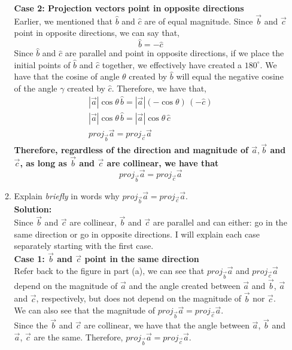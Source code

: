 \documentclass[12pt]{book}
\begin{document}
\begin{enumerate}
\begin{enumerate}
\textbf{Case 2: Projection vectors point in opposite directions}\\
Earlier, we mentioned that $\hat{b}$ and $\hat{c}$ are of equal magnitude. Since $\vec{b}$ and $\vec{c}$ point in opposite directions, we can say that,
$$\hat{b} = -\hat{c}$$
Since $\hat{b}$ and $\hat{c}$ are parallel and point in opposite directions, if we place the initial points of $\hat{b}$ and $\hat{c}$ together, we effectively have created a $180^{\circ}$. We have that the cosine of angle $\theta$ created by $\hat{b}$ will equal the negative cosine of the angle $\gamma$ created by $\hat{c}$. Therefore, we have that,
\begin{align}
    |\vec{a}| \cos\theta \, \hat{b} = |\vec{a}| (-\cos\theta) \, (-\hat{c}) \\
    |\vec{a}| \cos\theta \, \hat{b} = |\vec{a}| \cos\theta \, \hat{c}\\
    proj_{\vec{b}}\vec{a} = proj_{\vec{c}}\vec{a}
\end{align}
\textbf{Therefore, regardless of the direction and magnitude of $\vec{a}, \vec{b}$ and $\vec{c}$, as long as $\vec{b}$ and $\vec{c}$ are collinear, we have that
$$proj_{\vec{b}}\vec{a} = proj_{\vec{c}}\vec{a}$$}



\item Explain \emph{briefly} in words why $proj_{\vec{b}}\vec{a} = proj_{\vec{c}}\vec{a}$.\\

\textbf{Solution:}\\
Since $\vec{b}$ and $\vec{c}$ are collinear, $\vec{b}$ and $\vec{c}$ are parallel and can either: go in the same direction or go in opposite directions. I will explain each case separately starting with the first case.\\

\textbf{Case 1: $\vec{b}$ and $\vec{c}$ point in the same direction}\\
Refer back to the figure in part (a), we can see that $proj_{\vec{b}}\vec{a}$ and $proj_{\vec{c}}\vec{a}$ depend on the magnitude of $\vec{a}$ and the angle created between $\vec{a}$ and $\vec{b}$, $\vec{a}$ and $\vec{c}$, respectively, but does not depend on the magnitude of $\vec{b}$ nor $\vec{c}$. We can also see that
the magnitude of $proj_{\vec{b}}\vec{a} = proj_{\vec{c}}\vec{a}$.\\

Since the $\vec{b}$ and $\vec{c}$ are collinear, we have that the angle between $\vec{a}$, $\vec{b}$ and $\vec{a}$, $\vec{c}$ are the same. Therefore, $proj_{\vec{b}}\vec{a} = proj_{\vec{c}}\vec{a}$.\\


\end{enumerate}
\end{enumerate}
\end{document}
